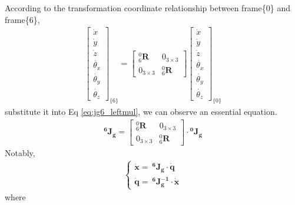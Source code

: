 According to the transformation coordinate relationship between frame\{0\} and frame\{6\},
\begin{equation}
\begin{split}
\begin{bmatrix}
\dot{x}\\ 
\dot{y}\\ 
\dot{z}\\ 
\dot{\theta_x}\\ 
\dot{\theta_y}\\
\dot{\theta_z} 
\end{bmatrix}_{\!\{6\}}
=
\begin{bmatrix}
^0_6\mathbf{R} & 0_{ 3\times 3} \\ 
0_{ 3\times 3} & ^0_6\mathbf{R}
\end{bmatrix}
\begin{bmatrix}
\dot{x}\\ 
\dot{y}\\ 
\dot{z}\\ 
\dot{\theta_x}\\ 
\dot{\theta_y}\\
\dot{\theta_z} 
\end{bmatrix}_{\!\{0\}}
\end{split}
\end{equation}
substitute it into Eq \ref{eq:jg6_leftmul}, we can observe an essential equation.
\begin{equation}
\begin{split}
\mathbf{^6\!J_g}
= 
\begin{bmatrix}
^0_6\mathbf{R} & 0_{ 3\times 3} \\ 
0_{ 3\times 3} & ^0_6\mathbf{R}
\end{bmatrix}
\cdot
\mathbf{^0\!J_g}
\end{split}
\end{equation}
Notably,
\begin{equation}
\label{eq:jg6}
\begin{split}
\left\{\begin{matrix}
\boldsymbol{\dot{x}} = \ \mathbf{^6\!J_g} \cdot \boldsymbol{\dot{q}}
\\ 
\boldsymbol{\dot{q}} = \ \mathbf{^6\!J_g^{-1}} \cdot \boldsymbol{\dot{x}}
\end{matrix}\right.	
\end{split}
\end{equation}
where
